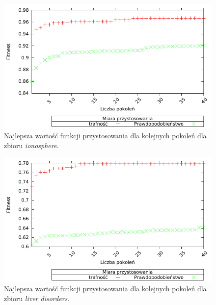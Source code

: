         \begin{figure}
                \includegraphics[scale=0.90]{figures/results/fitness/fitness-ionosphere}
                \caption{Najlepsza wartość funkcji przystosowania dla kolejnych pokoleń dla zbioru \emph{ionosphere}.\label{fig:fit-ionosphere}}
        \end{figure}    
               
        \begin{figure}
                \includegraphics[scale=0.90]{figures/results/fitness/fitness-liver-disorders}
                \caption{Najlepsza wartość funkcji przystosowania dla kolejnych pokoleń dla zbioru \emph{liver disorders}.\label{fig:fit-liver-disorders}}
        \end{figure}    

